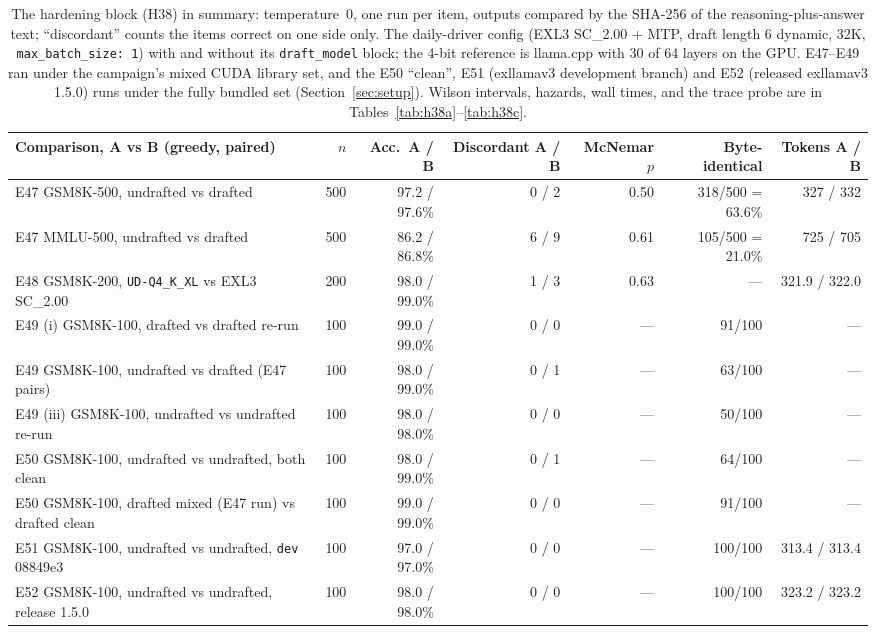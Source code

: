 \documentclass[11pt]{article}
\newcommand{\q}[1]{\texttt{#1}}
\begin{document}
\begin{table}[htbp]
\centering
\scriptsize
\setlength{\tabcolsep}{2.5pt}
\begin{tabular}{L{4.6cm}rrrrrr}
\toprule
Comparison, A vs B (greedy, paired) & $n$ & Acc.\ A / B & Discordant A / B & McNemar $p$ & Byte-identical & Tokens A / B \\
\midrule
E47 GSM8K-500, undrafted vs drafted & 500 & 97.2 / 97.6\% & 0 / 2 & 0.50 & 318/500 = 63.6\% & 327 / 332 \\
E47 MMLU-500, undrafted vs drafted & 500 & 86.2 / 86.8\% & 6 / 9 & 0.61 & 105/500 = 21.0\% & 725 / 705 \\
E48 GSM8K-200, \q{UD-Q4\_K\_XL} vs EXL3 SC\_2.00 & 200 & 98.0 / 99.0\% & 1 / 3 & 0.63 & --- & 321.9 / 322.0 \\
E49 (i) GSM8K-100, drafted vs drafted re-run & 100 & 99.0 / 99.0\% & 0 / 0 & --- & 91/100 & --- \\
E49 GSM8K-100, undrafted vs drafted (E47 pairs) & 100 & 98.0 / 99.0\% & 0 / 1 & --- & 63/100 & --- \\
E49 (iii) GSM8K-100, undrafted vs undrafted re-run & 100 & 98.0 / 98.0\% & 0 / 0 & --- & 50/100 & --- \\
E50 GSM8K-100, undrafted vs undrafted, both clean & 100 & 98.0 / 99.0\% & 0 / 1 & --- & 64/100 & --- \\
E50 GSM8K-100, drafted mixed (E47 run) vs drafted clean & 100 & 99.0 / 99.0\% & 0 / 0 & --- & 91/100 & --- \\
E51 GSM8K-100, undrafted vs undrafted, \q{dev} 08849e3 & 100 & 97.0 / 97.0\% & 0 / 0 & --- & 100/100 & 313.4 / 313.4 \\
E52 GSM8K-100, undrafted vs undrafted, release 1.5.0 & 100 & 98.0 / 98.0\% & 0 / 0 & --- & 100/100 & 323.2 / 323.2 \\
\bottomrule
\end{tabular}
\caption{The hardening block (H38) in summary: temperature~0, one run per
item, outputs compared by the SHA-256 of the reasoning-plus-answer text;
``discordant'' counts the items correct on one side only. The daily-driver
config (EXL3 SC\_2.00 + MTP, draft length 6 dynamic, 32K,
\q{max\_batch\_size: 1}) with and without its \q{draft\_model} block; the
4-bit reference is llama.cpp with 30 of 64 layers on the GPU. E47--E49 ran
under the campaign's mixed CUDA library set, and the E50 ``clean'', E51
(exllamav3 development branch) and E52 (released exllamav3 1.5.0) runs under
the fully bundled set (Section~\ref{sec:setup}). Wilson intervals, hazards,
wall times, and the trace probe are in Tables~\ref{tab:h38a}--\ref{tab:h38c}.}
\label{tab:h38}
\end{table}
\end{document}
